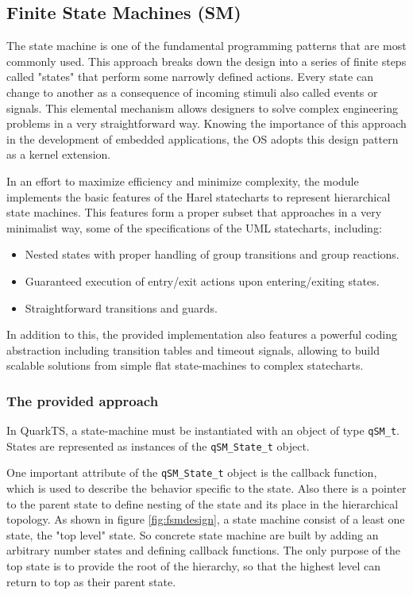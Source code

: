 \subsection{Finite State Machines (SM)}
The state machine is one of the fundamental programming patterns that are most commonly used. This approach breaks down the design into a series of finite steps called "states" that perform some narrowly defined actions. Every state can change to another as a consequence of incoming stimuli also called events or signals. This elemental mechanism allows designers to solve complex engineering problems in a very straightforward way.
Knowing the importance of this approach in the development of embedded applications, the OS adopts this design pattern as a kernel extension.

In an effort to maximize efficiency and minimize complexity, the module implements the basic features of the Harel statecharts to represent hierarchical state machines. This features form a proper subset that approaches in a very minimalist way, some of the specifications of the UML statecharts, including:

\begin{itemize}
    \item Nested states with proper handling of group transitions and group reactions.
    \item Guaranteed execution of entry/exit actions upon entering/exiting states.
    \item Straightforward transitions and guards.
\end{itemize} 

In addition to this, the provided implementation also features a powerful coding abstraction including transition tables and timeout signals, allowing to build scalable solutions from simple flat state-machines to complex statecharts. 

\subsubsection{The provided approach}

In QuarkTS, a state-machine must be instantiated with an object of type \lstinline{qSM_t}. States are represented as instances of the \lstinline{qSM_State_t} object. 



One important attribute of the \lstinline{qSM_State_t} object is the callback function, which is used to describe the behavior specific to the state. Also there is a pointer to the parent state to define nesting of the state and its place in the hierarchical topology.
As shown in figure \ref{fig:fsmdesign}, a state machine consist of a least one state, the "top level" state.
So concrete state machine are built by adding an arbitrary number states and defining callback functions. The only purpose of the top state is to provide the root of the hierarchy, so that the highest level can return to top as their parent state. 

